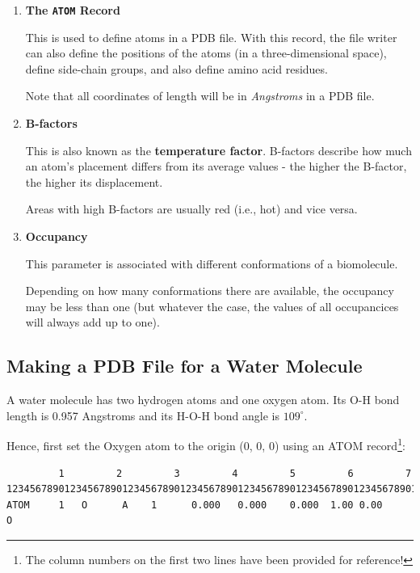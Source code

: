 \documentclass[
  letterpaper,
  DIV=11,
  numbers=noendperiod]{scrreprt}
\begin{document}
\begin{enumerate}
\def\labelenumi{\arabic{enumi}.}
\item
  \textbf{The \texttt{ATOM} Record}

  This is used to define atoms in a PDB file. With this record, the file
  writer can also define the positions of the atoms (in a
  three-dimensional space), define side-chain groups, and also define
  amino acid residues.

  Note that all coordinates of length will be in \emph{Angstroms} in a
  PDB file.
\item
  \textbf{B-factors}

  This is also known as the \textbf{temperature factor}. B-factors
  describe how much an atom's placement differs from its average values
  - the higher the B-factor, the higher its displacement.

  Areas with high B-factors are usually red (i.e., hot) and vice versa.
\item
  \textbf{Occupancy}

  This parameter is associated with different conformations of a
  biomolecule.

  Depending on how many conformations there are available, the occupancy
  may be less than one (but whatever the case, the values of all
  occupancices will always add up to one).
\end{enumerate}

\hypertarget{making-a-pdb-file-for-a-water-molecule}{%
\subsection{Making a PDB File for a Water
Molecule}\label{making-a-pdb-file-for-a-water-molecule}}

A water molecule has two hydrogen atoms and one oxygen atom. Its O-H
bond length is 0.957 Angstroms and its H-O-H bond angle is
\(109^\circ\).

Hence, first set the Oxygen atom to the origin (0, 0, 0) using an ATOM
record\footnote{The column numbers on the first two lines have been
  provided for reference!}:

\begin{verbatim}
         1         2         3         4         5         6         7
1234567890123456789012345678901234567890123456789012345678901234567890123456789
ATOM     1   O      A    1      0.000   0.000    0.000  1.00 0.00            O
\end{verbatim}
\end{document}
